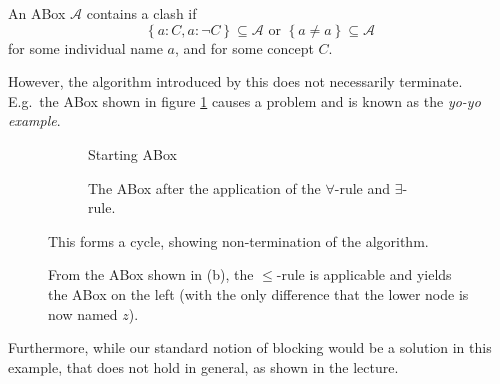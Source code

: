 \begin{mdframed}[frametitle= The new clash]
An ABox $\mathcal{A}$ contains a clash if
\[
\left\{ a:C, a: \neg C \right\} \subseteq \mathcal{A} \text{ or } \left\{ a \neq a \right\} \subseteq \mathcal{A}
\]
for some individual name $a$, and for some concept $C$.
\end{mdframed}
However, the algorithm introduced by this does not necessarily terminate.
E.g.\ the ABox shown in figure \ref{fig:yoyo-example} causes a problem and is known as the \textit{yo-yo example}.
	\begin{figure}[H]
		\centering
		\begin{subfigure}[t]{.475\textwidth}
			\centering
			\caption{Starting ABox}
		\end{subfigure}
		\hfill
		\begin{subfigure}[t]{.475\textwidth}
			\centering
			\caption{The ABox after the application of the $\forall$-rule and $\exists$-rule.}
		\end{subfigure}
		\caption{From the ABox shown in (b), the $ \leq$-rule is applicable and yields the ABox on the left
		(with the only difference that the lower node is now named $z$).}
		This forms a cycle, showing non-termination of the algorithm.
		\label{fig:yoyo-example}
	\end{figure}

Furthermore, while our standard notion of blocking would be a solution in this example,
that does not hold in general, as shown in the lecture.
